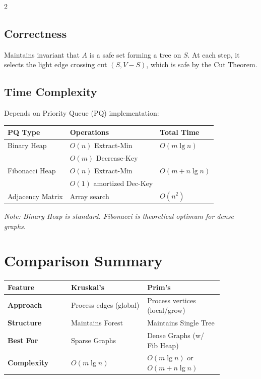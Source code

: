 \documentclass[10pt, a4paper]{article}
\begin{document}
\begin{multicols*}{2}
\subsection{Correctness}
Maintains invariant that $A$ is a safe set forming a tree on $S$. At each step, it selects the light edge crossing cut $(S, V-S)$, which is safe by the Cut Theorem.

\subsection{Time Complexity}
Depends on Priority Queue (PQ) implementation:
\begin{center}
\begin{tabular}{|l|l|l|}
\hline
\textbf{PQ Type} & \textbf{Operations} & \textbf{Total Time} \\ \hline
Binary Heap & $O(n)$ Extract-Min & $O(m \lg n)$ \\
 & $O(m)$ Decrease-Key & \\ \hline
Fibonacci Heap & $O(n)$ Extract-Min & $O(m + n \lg n)$ \\
 & $O(1)$ amortized Dec-Key & \\ \hline
Adjacency Matrix & Array search & $O(n^2)$ \\ \hline
\end{tabular}
\end{center}
\textit{Note: Binary Heap is standard. Fibonacci is theoretical optimum for dense graphs.}

\section{Comparison Summary}
\begin{center}
\renewcommand{\arraystretch}{1.2}
\begin{tabular}{|p{0.25\linewidth}|p{0.3\linewidth}|p{0.3\linewidth}|}
\hline
\textbf{Feature} & \textbf{Kruskal's} & \textbf{Prim's} \\ \hline
\textbf{Approach} & Process edges (global) & Process vertices (local/grow) \\ \hline
\textbf{Structure} & Maintains Forest & Maintains Single Tree \\ \hline
\textbf{Best For} & Sparse Graphs & Dense Graphs (w/ Fib Heap) \\ \hline
\textbf{Complexity} & $O(m \lg n)$ & $O(m \lg n)$ or $O(m+n \lg n)$ \\ \hline
\end{tabular}
\end{center}

\end{multicols*}
\end{document}
